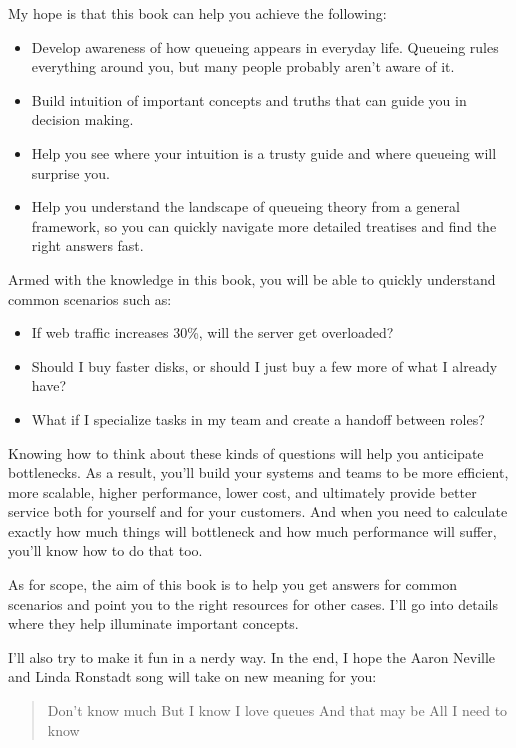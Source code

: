\documentclass{vivid_layout_pdf}
\begin{document}
My hope is that this book can help you achieve the following:

\begin{itemize}
\item Develop awareness of how queueing appears in everyday life. Queueing rules everything around you, but many people probably aren't aware of it.
\item Build intuition of important concepts and truths that can guide you in decision making.
\item Help you see where your intuition is a trusty guide and where queueing will surprise you.
\item Help you understand the landscape of queueing theory from a general framework, so you can quickly navigate more detailed treatises and find the right answers fast.
\end{itemize}

Armed with the knowledge in this book, you will be able to quickly understand common scenarios such as:

\begin{itemize}
\item If web traffic increases 30\%, will the server get overloaded?
\item Should I buy faster disks, or should I just buy a few more of what I already have?
\item What if I specialize tasks in my team and create a handoff between roles?
\end{itemize}

Knowing how to think about these kinds of questions will help you anticipate bottlenecks. As a result, you'll build your systems and teams to be more efficient, more scalable, higher performance, lower cost, and ultimately provide better service both for yourself and for your customers. And when you need to calculate exactly how much things will bottleneck and how much performance will suffer, you'll know how to do that too.

As for scope, the aim of this book is to help you get answers for common scenarios and point you to the right resources for other cases. I'll go into details where they help illuminate important concepts.

I'll also try to make it fun in a nerdy way. In the end, I hope the Aaron Neville and Linda Ronstadt song will take on new meaning for you:

\begin{quote}
Don't know much\newline
But I know I love queues\newline
And that may be\newline
All I need to know
\end{quote}
\end{document}
